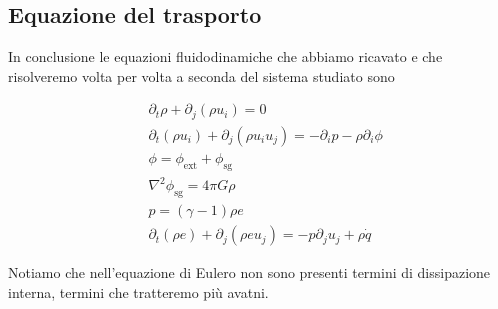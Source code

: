 \subsection{Equazione del trasporto}
In conclusione le equazioni fluidodinamiche che abbiamo ricavato e che risolveremo volta per volta a seconda del sistema studiato sono
\begin{EQ}
\begin{align}
&\partial_t \rho + \partial_j (\rho u_i) =0 \label{eq:Finale1}\\
&\partial_t (\rho u_i) + \partial_j(\rho u_i u_j )= -\partial_i p -\rho\partial_i \phi  \label{eq:Finale2} \\
&\phi = \phi_\mathrm{ext} + \phi_\mathrm{sg} \label{eq:Finale3} \\
&\nabla^2 \phi_\mathrm{sg} = 4 \pi G \rho  \label{eq:Finale4} \\
&p = (\gamma -1) \rho e \label{eq:Finale5} \\
&\partial_t (\rho e) + \partial_j (\rho e u_j) = -p \partial_j u_j + \rho \dot{q} \label{eq:Finale6}
\end{align}
\end{EQ}
Notiamo che nell'equazione di Eulero non sono presenti termini di dissipazione interna, termini che tratteremo più avatni.
 
